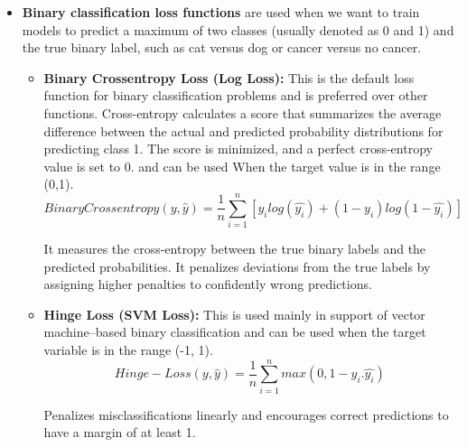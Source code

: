 \begin{itemize}
\begin{itemize}
    \end{itemize}
    \item \textbf{Binary classification loss functions} are used when we want to train models to predict a maximum of two classes (usually denoted as 0 and 1) and the true binary label, such as cat versus dog or cancer versus no cancer. \\
          \begin{itemize}
          \item \textbf{Binary Crossentropy Loss (Log Loss): } This is the default loss function for binary classification problems and is preferred over other functions. Cross-entropy calculates a score that summarizes the average difference between the actual and predicted probability distributions for predicting class 1. The score is minimized, and a perfect cross-entropy value is set to 0.  
          and can be used When the target value is in the range (0,1).
          $$Binary Crossentropy(y, \hat{y})=\frac{1}{n}\sum_{i=1}^{n}[y_{i}log(\hat{y_{i}})+(1-y_{i})log(1-\hat{y_{i}})]$$

          It measures the cross-entropy between the true binary labels and the predicted probabilities. It penalizes deviations from the true labels by assigning higher penalties to confidently wrong predictions.
          \item \textbf{Hinge Loss (SVM Loss):} This is used mainly in support of vector machine–based binary classification and can be used when the target variable is in the range (-1, 1).
          $$Hinge-Loss(y,\hat{y})= \frac{1}{n}\sum_{i=1}^{n}max(0,1-y_{i}.\hat{y_{i}})$$

          Penalizes misclassifications linearly and encourages correct predictions to have a margin of at least 1.


\end{itemize}
\end{itemize}
